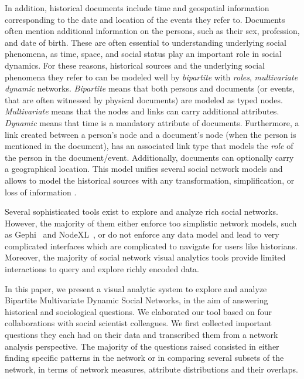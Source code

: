 In addition, historical documents include time and geospatial information corresponding to the date and location of the events they refer to. Documents often mention additional information on the persons, such as their sex, profession, and date of birth. These are often essential to understanding underlying social phenomena, as time, space, and social status play an important role in social dynamics.
For these reasons, historical sources and the underlying social phenomena they refer to can be modeled well by \emph{bipartite} with \emph{roles},  \emph{multivariate} \emph{dynamic} networks. \emph{Bipartite} means that both persons and documents (or events, that are often witnessed by physical documents) are modeled as typed nodes. \emph{Multivariate} means that the nodes and links can carry additional attributes. \emph{Dynamic} means that time is a mandatory attribute of documents. Furthermore, a link created between a person's node and a document's node (when the person is mentioned in the document), has an associated link type that models the \emph{role} of the person in the document/event. Additionally, documents can optionally carry a geographical location. This model unifies several social network models and allows to model the historical sources with any transformation, simplification, or loss of information \cite{cristofoli_aux_2008}.

Several sophisticated tools exist to explore and analyze rich social networks. However, the majority of them either enforce too simplistic network models, such as Gephi~\cite{Gephi} and NodeXL~\cite{NodeXL}, or do not enforce any data model and lead to very complicated interfaces which are complicated to navigate for users like historians.
Moreover, the majority of social network visual analytics tools provide limited interactions to query and explore richly encoded data.


In this paper, we present a visual analytic system to explore and analyze Bipartite Multivariate Dynamic Social Networks, in the aim of answering historical and sociological questions. We elaborated our tool based on four collaborations with social scientist colleagues. We first collected important questions they each had on their data and transcribed them from a network analysis perspective. The majority of the questions raised consisted in either finding specific patterns in the network or in comparing several subsets of the network, in terms of network measures, attribute distributions and their overlaps.

